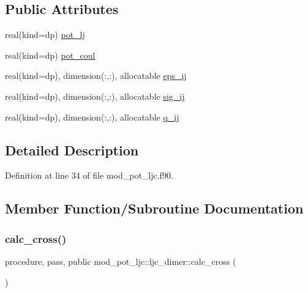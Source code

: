 \subsection*{Public Attributes}
\begin{DoxyCompactItemize}
\item 
real(kind=dp) \hyperlink{structmod__pot__ljc_1_1ljc__dimer_a5a6a40d3a92d95853526e8797bd8cd69}{pot\+\_\+lj}
\item 
real(kind=dp) \hyperlink{structmod__pot__ljc_1_1ljc__dimer_aabd6f6d49768b97321681a75d6ab8780}{pot\+\_\+coul}
\item 
real(kind=dp), dimension(\+:,\+:), allocatable \hyperlink{structmod__pot__ljc_1_1ljc__dimer_aea7342431824d6fcb5ac9eb83ae6e718}{eps\+\_\+ij}
\item 
real(kind=dp), dimension(\+:,\+:), allocatable \hyperlink{structmod__pot__ljc_1_1ljc__dimer_aab9f6520582a996e2ab3d5baa9d0e6d2}{sig\+\_\+ij}
\item 
real(kind=dp), dimension(\+:,\+:), allocatable \hyperlink{structmod__pot__ljc_1_1ljc__dimer_a31c0e91bb8bff6e3ae0c09db6f058869}{q\+\_\+ij}
\end{DoxyCompactItemize}


\subsection{Detailed Description}


Definition at line 34 of file mod\+\_\+pot\+\_\+ljc.\+f90.



\subsection{Member Function/\+Subroutine Documentation}
\mbox{\label{structmod__pot__ljc_1_1ljc__dimer_a11ff019bca3a0cfd88b8bc539639f7ed}} 
\subsubsection{\texorpdfstring{calc\+\_\+cross()}{calc\_cross()}}
{\footnotesize\ttfamily procedure, pass, public mod\+\_\+pot\+\_\+ljc\+::ljc\+\_\+dimer\+::calc\+\_\+cross (\begin{DoxyParamCaption}{ }\end{DoxyParamCaption})}



